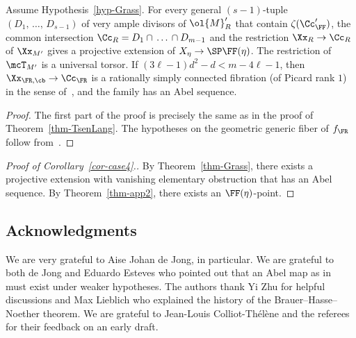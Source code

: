 \begin{theo}\label{thm-Grass}
Assume Hypothesis~\ref{hyp-Grass}. For every general $(s-1)$-tuple $(D_1,\,\dots,\,D_{s-1})$ of very ample divisors of $\ol{M}'_R$ that contain $\zeta(\Cc'_{\FF})$, the common intersection $\Cc_R = D_1\cap \,\dots\,\cap D_{m-1}$ and the restriction $\Xx_{R} \to \Cc_R$ of $\Xx_{M'}$ gives a projective extension of $X_\eta \to \SP \FF(\eta)$. The restriction of $\mcT_{M'}$ is a universal torsor. If $(3\ell -1)d^2 -d < m-4\ell-1$, then $\Xx_{\FR,\cb}\to \Cc_{\FR}$ is a rationally simply connected fibration (of Picard rank $1$) in the sense of~\cite[Theorem~13.1]{dJHS}, and the family has an Abel sequence.
\end{theo}

\begin{proof}
The first part of the proof is precisely the same as in the proof of Theorem~\ref{thm-TsenLang}. The hypotheses on the geometric generic fiber of $f_\FR$ follow from~\cite[Theorem~1.8]{Findley}.
\end{proof}


\begin{proof}[Proof of Corollary~\ref{cor-case4}.]
By Theorem~\ref{thm-Grass}, there exists a projective extension with vanishing elementary obstruction that has an Abel sequence. By Theorem~\ref{thm-app2}, there exists an $\FF(\eta)$-point.
\end{proof}

\subsection*{Acknowledgments}
We are very grateful to Aise Johan de Jong, in particular. We are grateful to both de Jong and Eduardo Esteves who pointed out that an Abel map as in~\cite{dJHS} must exist under weaker hypotheses. The authors thank Yi Zhu for helpful discussions and Max Lieblich who explained the history of the Brauer--Hasse--Noether theorem. We are grateful to Jean-Louis Colliot-Thélène and the referees for their feedback on an early draft.




